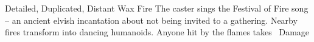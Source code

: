   {Detailed, Duplicated, Distant}%
  {Wax}%
  {Fire}%
  {}%
  {The caster sings the Festival of Fire song -- an ancient elvish incantation about not being invited to a gathering.
    Nearby fires transform into dancing humanoids.
    Anyone hit by the flames takes \showDam\ Damage}%
  {}

